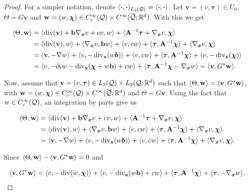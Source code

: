 \begin{proof}
    For a simpler notation, denote $\langle \boldsymbol{\cdot} , \boldsymbol{\cdot} \rangle_{L_2(\mathcal{Q})}=\langle \boldsymbol{\cdot} , \boldsymbol{\cdot} \rangle$. Let $\mathbf{v}=(v,\boldsymbol{\tau})\in U_0$, $\Theta=G\mathbf{v}$ and $\mathbf{w}=(w,\boldsymbol{\chi})\in C_c^\infty(\mathcal{Q})\times C^\infty(\overline{\mathcal{Q}};\mathbb{R}^d)$. With this we get

    \begin{align*}
        \langle \Theta , \mathbf{w} \rangle&=\langle \operatorname{div}(\mathbf{v})+\mathbf{b}\nabla_{\boldsymbol{x}} v+cv , w \rangle+\langle \mathbf{A}^{-1}\boldsymbol{\tau}+\nabla_{\boldsymbol{x}} v , \boldsymbol{\chi} \rangle\\
        &=\langle \operatorname{div}(\mathbf{v}) , w \rangle+\langle \nabla_{\boldsymbol{x}} v , \mathbf{b}w \rangle+ \langle v , cw \rangle+\langle \boldsymbol{\tau} , \mathbf{A}^{-1}\boldsymbol{\chi} \rangle+\langle \nabla_{\boldsymbol{x}} v , \boldsymbol{\chi} \rangle\\
        &=\langle \mathbf{v} , -\nabla w \rangle+\langle v , -\operatorname{div}_{\mathbf{x}}(w\boldsymbol{b}) \rangle+\langle v , cw \rangle+\langle \boldsymbol{\tau} , \mathbf{A}^{-1}\boldsymbol{\chi} \rangle+\langle v , -\operatorname{div}_{\mathbf{x}}(\boldsymbol{\chi}) \rangle\\
        &=\langle v , -\partial_tw-\operatorname{div}_{\mathbf{x}}(\boldsymbol{\chi}+w\mathbf{b})+cw \rangle+\langle \boldsymbol{\tau} , \mathbf{A}^{-1}\boldsymbol{\chi}-\nabla_{\boldsymbol{x}} w \rangle=\langle \mathbf{v} , G^*\mathbf{w} \rangle.
    \end{align*}

    Now, assume that $\mathbf{v}=(v,\boldsymbol{\tau})\in L_2(\mathcal{Q})\times L_2(\mathcal{Q};\mathbb{R}^d)$ such that $\langle \Theta , \mathbf{w} \rangle=\langle \mathbf{v} , G^*\mathbf{w} \rangle$, with $\mathbf{w}=(w,\boldsymbol{\chi})\in C_c^\infty(\mathcal{Q})\times C^\infty(\overline{\mathcal{Q}};\mathbb{R}^d)$ and $\Theta=G\mathbf{v}$. Using the fact that $w\in C_c^\infty(\mathcal{Q})$, an integration by parts give us

    \begin{align*}
        \langle \Theta , \mathbf{w} \rangle&=\langle \operatorname{div}(\mathbf{v})+\mathbf{b}\nabla_{\boldsymbol{x}} v+cv , w \rangle+\langle \mathbf{A}^{-1}\boldsymbol{\tau}+\nabla_{\boldsymbol{x}} v , \boldsymbol{\chi} \rangle\\
        &=\langle \operatorname{div}(\mathbf{v}) , w \rangle+\langle \nabla_{\boldsymbol{x}} v , \mathbf{b}w \rangle+ \langle v , cw \rangle+\langle \boldsymbol{\tau} , \mathbf{A}^{-1}\boldsymbol{\chi} \rangle+\langle \nabla_{\boldsymbol{x}} v , \boldsymbol{\chi} \rangle\\
        &=\langle \mathbf{v} , -\nabla w \rangle+\langle v , -\operatorname{div}_{\mathbf{x}}(w\boldsymbol{b}) \rangle+\langle v , cw \rangle+\langle \boldsymbol{\tau} , \mathbf{A}^{-1}\boldsymbol{\chi} \rangle+\langle \nabla_{\boldsymbol{x}} v , \boldsymbol{\chi} \rangle.
    \end{align*}

    Since $\langle \Theta , \mathbf{w} \rangle-\langle \mathbf{v} , G^*\mathbf{w} \rangle=0$ and 
    
    $$\langle \mathbf{v} , G^*\mathbf{w} \rangle=\langle v , -\operatorname{div}(w,\boldsymbol{\chi}) \rangle+\langle v , -\operatorname{div}_{\mathbf{x}}(w\mathbf{b})+cw \rangle+\langle \boldsymbol{\tau} , \mathbf{A}^{-1}\boldsymbol{\chi} \rangle+\langle \boldsymbol{\tau} , -\nabla_{\boldsymbol{x}} w \rangle,$$


\end{proof}
